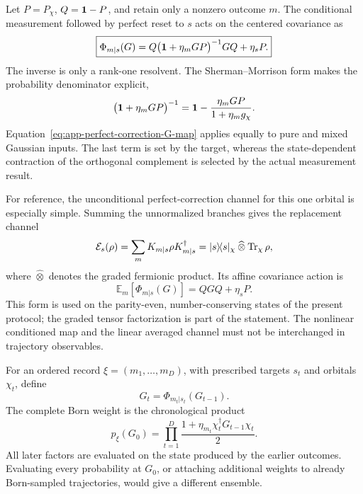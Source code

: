 Let \(P=P_\chi\), \(Q=\mathbf{1}-P\), and retain only a nonzero outcome \(m\).
The conditional measurement followed by perfect reset to \(s\) acts on the
centered covariance as
\begin{equation}
    \boxed{
    \Phi_{m|s}(G)
    =Q\bigl(\mathbf{1}+\eta_m GP\bigr)^{-1}GQ+\eta_sP .}
    \label{eq:app-perfect-correction-G-map}
\end{equation}
The inverse is only a rank-one resolvent.  The Sherman--Morrison form makes
the probability denominator explicit,
\begin{equation}
    \bigl(\mathbf{1}+\eta_m GP\bigr)^{-1}
    =\mathbf{1}-\frac{\eta_m GP}{1+\eta_m g_\chi}.
    \label{eq:app-rank-one-resolvent}
\end{equation}
Equation~\eqref{eq:app-perfect-correction-G-map} applies equally to pure and
mixed Gaussian inputs.  The last term is set by the target, whereas the
state-dependent contraction of the orthogonal complement is selected by the
actual measurement result.

For reference, the unconditional perfect-correction channel for this one
orbital is especially simple.  Summing the unnormalized branches gives the
replacement channel
\begin{equation}
    \mathcal E_s(\rho)
    =\sum_mK_{m|s}\rho K_{m|s}^\dagger
    =\lvert s\rangle\!\langle s\rvert_\chi
      \mathbin{\widehat\otimes}\operatorname{Tr}_\chi\rho,
    \label{eq:app-reset-channel-density}
\end{equation}
where \(\widehat\otimes\) denotes the graded fermionic product.  Its affine
covariance action is
\begin{equation}
    \mathbb E_m\!\left[\Phi_{m|s}(G)\right]
    =QGQ+\eta_sP.
    \label{eq:app-reset-channel-G}
\end{equation}
This form is used on the parity-even, number-conserving states of the present
protocol; the graded tensor factorization is part of the statement.
The nonlinear conditioned map and the linear averaged channel must not be
interchanged in trajectory observables.

For an ordered record
\(\xi=(m_1,\ldots,m_D)\), with prescribed targets \(s_t\) and orbitals
\(\chi_t\), define
\begin{equation}
    G_t=\Phi_{m_t|s_t}(G_{t-1}).
\end{equation}
The complete Born weight is the chronological product
\begin{equation}
    \boxed{
    p_\xi(G_0)
    =\prod_{t=1}^{D}
      \frac{1+\eta_{m_t}\chi_t^\dagger G_{t-1}\chi_t}{2}.}
    \label{eq:app-record-born-weight}
\end{equation}
All later factors are evaluated on the state produced by the earlier
outcomes.  Evaluating every probability at \(G_0\), or attaching additional
weights to already Born-sampled trajectories, would give a different
ensemble.

